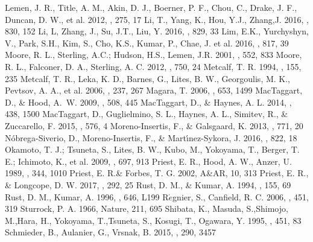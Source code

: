 \documentclass[12pt,preprint]{aastex}
\begin{document}
\begin{CJK*}{UTF8}{gbsn}
\begin{thebibliography}{}
 Lemen, J. R., Title, A. M., Akin, D. J., Boerner, P. F., Chou, C., Drake, J. F., Duncan, D. W., et al. 2012, \solphys, 275, 17
 Li, T., Yang, K., Hou, Y.J., Zhang,J. 2016, \apj, 830, 152
 Li, L, Zhang, J., Su, J.T., Liu, Y. 2016, \apjl, 829, 33
 Lim, E.K., Yurchyshyn, V., Park, S.H., Kim, S., Cho, K.S., Kumar, P., Chae, J. et al. 2016, \apj, 817, 39
 Moore, R. L., Sterling, A.C.; Hudson, H.S., Lemen, J.R. 2001, \apj, 552, 833
 Moore, R. L., Falconer, D. A., Sterling, A. C. 2012, \apj, 750, 24
 Metcalf, T. R. 1994, \solphys, 155, 235
 Metcalf, T. R., Leka, K. D., Barnes, G., Lites, B. W., Georgoulis, M. K., Pevtsov, A. A., et al. 2006, \solphys, 237, 267
 Magara, T. 2006, \apj, 653, 1499 
 MacTaggart, D., \& Hood, A.~W. 2009, \aap, 508, 445 
 MacTaggart, D., \& Haynes, A. L. 2014, \mnras, 438, 1500 
 MacTaggart, D., Guglielmino, S. L., Haynes, A. L., Simitev, R., \& Zuccarello, F. 2015, \aap, 576, 4
 Moreno-Insertis, F., \& Galsgaard, K. 2013, \apj, 771, 20
 N{\'o}brega-Siverio, D., Moreno-Insertis, F., \& Mart{\'{\i}}nez-Sykora, J. 2016, \apj, 822, 18 
 Okamoto, T. J.; Tsuneta, S., Lites, B. W., Kubo, M., Yokoyama, T., Berger, T. E.; Ichimoto, K., et al. 2009, \apj, 697, 913
 Priest, E. R., Hood, A. W., Anzer, U. 1989, \apj, 344, 1010
 Priest, E. R.\& Forbes, T. G. 2002, A\&AR, 10, 313
 Priest, E. R., \& Longcope, D. W. 2017, \solphys, 292, 25
 Rust, D. M., \& Kumar, A. 1994, \solphys, 155, 69
 Rust, D. M., Kumar, A. 1996, \apj, 646, L199
 R$\acute{e}$gnier, S., Canfield, R. C. 2006, \aap, 451, 319
 Sturrock, P. A. 1966, Nature, 211, 695
 Shibata, K., Masuda, S.,Shimojo, M.,Hara, H., Yokoyama, T.,Tsuneta, S., Kosugi, T., Ogawara, Y. 1995, \apjl, 451, 83
 Schmieder, B., Aulanier, G., Vrsnak, B. 2015, \solphys, 290, 3457

\end{thebibliography}
\end{CJK*}
\end{document}
